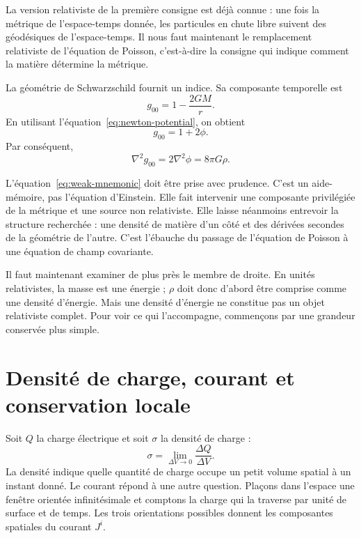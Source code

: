 La version relativiste de la première consigne est déjà connue : une fois la métrique de l’espace-temps donnée, les particules en chute libre suivent des géodésiques de l’espace-temps. Il nous faut maintenant le remplacement relativiste de l’équation de Poisson, c’est-à-dire la consigne qui indique comment la matière détermine la métrique.

La géométrie de Schwarzschild fournit un indice. Sa composante temporelle est
\begin{equation}
 g_{00}=1-\frac{2GM}{r}.
\end{equation}
En utilisant l’équation~\eqref{eq:newton-potential}, on obtient
\begin{equation}
 g_{00}=1+2\phi.
\end{equation}
Par conséquent,
\begin{equation}
 \nabla^2g_{00}=2\nabla^2\phi=8\pi G\rho.
 \label{eq:weak-mnemonic}
\end{equation}

L’équation~\eqref{eq:weak-mnemonic} doit être prise avec prudence. C’est un aide-mémoire, pas l’équation d’Einstein. Elle fait intervenir une composante privilégiée de la métrique et une source non relativiste. Elle laisse néanmoins entrevoir la structure recherchée : une densité de matière d’un côté et des dérivées secondes de la géométrie de l’autre. C’est l’ébauche du passage de l’équation de Poisson à une équation de champ covariante.

Il faut maintenant examiner de plus près le membre de droite. En unités relativistes, la masse est une énergie ; \(\rho\) doit donc d’abord être comprise comme une densité d’énergie. Mais une densité d’énergie ne constitue pas un objet relativiste complet. Pour voir ce qui l’accompagne, commençons par une grandeur conservée plus simple.

\section{Densité de charge, courant et conservation locale}

Soit \(Q\) la charge électrique et soit \(\sigma\) la densité de charge :
\begin{equation}
 \sigma=\lim_{\Delta V\to0}\frac{\Delta Q}{\Delta V}.
\end{equation}
La densité indique quelle quantité de charge occupe un petit volume spatial à un instant donné. Le courant répond à une autre question. Plaçons dans l’espace une fenêtre orientée infinitésimale et comptons la charge qui la traverse par unité de surface et de temps. Les trois orientations possibles donnent les composantes spatiales du courant \(J^i\).

